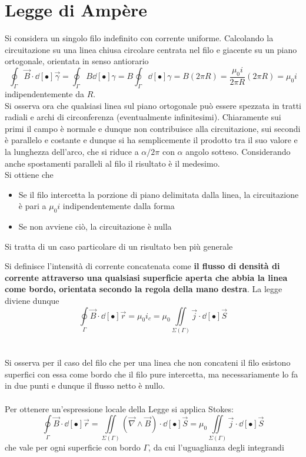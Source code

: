 \section{Legge di Ampère}
Si considera un singolo filo indefinito con corrente uniforme. Calcolando la circuitazione su una linea chiusa circolare centrata nel filo e giacente su un piano ortogonale, orientata in senso antiorario
\[\oint_\Gamma \vec{B} \cdot \dd[•]{\vec{\gamma}} = \oint_\Gamma B \dd[•]{\gamma} = B \oint_\Gamma \dd[•]{\gamma} = B (2 \pi R) = \frac{\mu_0 i}{2 \pi R} (2 \pi R) = \mu_0 i\]
indipendentemente da $R$. 
\\Si osserva ora che qualsiasi linea sul piano ortogonale può essere spezzata in tratti radiali e archi di circonferenza (eventualmente infinitesimi). Chiaramente sui primi il campo è normale e dunque non contribuisce alla circuitazione, sui secondi è parallelo e costante e dunque si ha semplicemente il prodotto tra il suo valore e la lunghezza dell'arco, che si riduce a $\alpha/2\pi$ con $\alpha$ angolo sotteso. Considerando anche spostamenti paralleli al filo il risultato è il medesimo.
\\Si ottiene che
\begin{itemize}
\item Se il filo intercetta la porzione di piano delimitata dalla linea, la circuitazione è pari a $\mu_0 i$ indipendentemente dalla forma
\item Se non avviene ciò, la circuitazione è nulla
\end{itemize}

Si tratta di un caso particolare di un risultato ben più generale

Si definisce l'intensità di corrente concatenata come \textbf{il flusso di densità di corrente attraverso una qualsiasi superficie aperta che abbia la linea come bordo, orientata secondo la regola della mano destra}. La legge diviene dunque
\[\oint\limits_\Gamma \vec{B} \cdot \dd[•]{\vec{r}} = \mu_0 i_c = \mu_0 \iint\limits_{\Sigma(\Gamma)} \vec{j} \cdot \dd[•]{\vec{S}}\]
\\~\\
Si osserva per il caso del filo che per una linea che non concateni il filo esistono superfici con essa come bordo che il filo pure intercetta, ma necessariamente lo fa in due punti e dunque il flusso netto è nullo.
\\~\\
Per ottenere un'espressione locale della Legge si applica Stokes:
\[\oint\limits_\Gamma \vec{B} \cdot \dd[•]{\vec{r}} = \iint\limits_{\Sigma(\Gamma)} (\vec{\nabla} \wedge \vec{B}) \cdot \dd[•]{\vec{S}} = \mu_0 \iint\limits_{\Sigma(\Gamma)} \vec{j} \cdot \dd[•]{\vec{S}}\]
che vale per ogni superficie con bordo $\Gamma$, da cui l'uguaglianza degli integrandi

